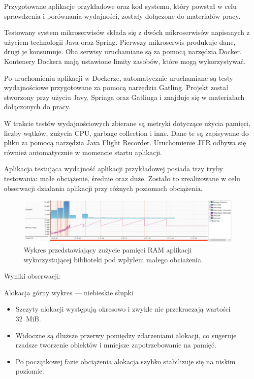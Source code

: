 \documentclass[runningheads,12pt]{llncs}
\begin{document}
Przygotowane aplikacje przykładowe oraz kod systemu, który powstał w celu sprawdzenia i porównania wydajności, zostały dołączone do materiałów pracy.

Testowany system mikroserwisów składa się z dwóch mikroserwisów napisanych z użyciem technologii Java oraz Spring. Pierwszy mikroserwis produkuje dane, drugi je konsumuje. Oba serwisy uruchamiane są za pomocą narzędzia Docker. Kontenery Dockera mają ustawione limity zasobów, które mogą wykorzystywać.

Po uruchomieniu aplikacji w Dockerze, automatycznie uruchamiane są testy wydajnościowe przygotowane za pomocą narzędzia Gatling. Projekt został stworzony przy użyciu Javy, Springa oraz Gatlinga i znajduje się w materiałach dołączonych do pracy.

W trakcie testów wydajnościowych zbierane są metryki dotyczące użycia pamięci, liczby wątków, zużycia CPU, garbage collection i inne. Dane te są zapisywane do pliku za pomocą narzędzia Java Flight Recorder. Uruchomienie JFR odbywa się również automatycznie w momencie startu aplikacji.

Aplikacja testująca wydajność aplikacji przykładowej posiada trzy tryby testowania: małe obciążenie, średnie oraz duże. Zostało to zrealizowane w celu obserwacji działania aplikacji przy różnych poziomach obciążenia.

\newpage

\begin{figure}
    \includegraphics[width=\linewidth]{images/library-memory-low-graph.jpg}
    \caption{Wykres przedstawiający zużycie pamięci RAM aplikacji wykorzystującej biblioteki pod wpłyłem małego obciażenia.} \label{fig1}
\end{figure}

Wyniki obserwacji:

Alokacja górny wykres — niebieskie słupki

\begin{itemize}
  \item Szczyty alokacji występują okresowo i zwykle nie przekraczają wartości 32~MiB.
  \item Widoczne są dłuższe przerwy pomiędzy zdarzeniami alokacji, co sugeruje rzadsze tworzenie obiektów i mniejsze zapotrzebowanie na pamięć.
  \item Po początkowej fazie obciążenia alokacja szybko stabilizuje się na niskim poziomie.
\end{itemize}
\end{document}
